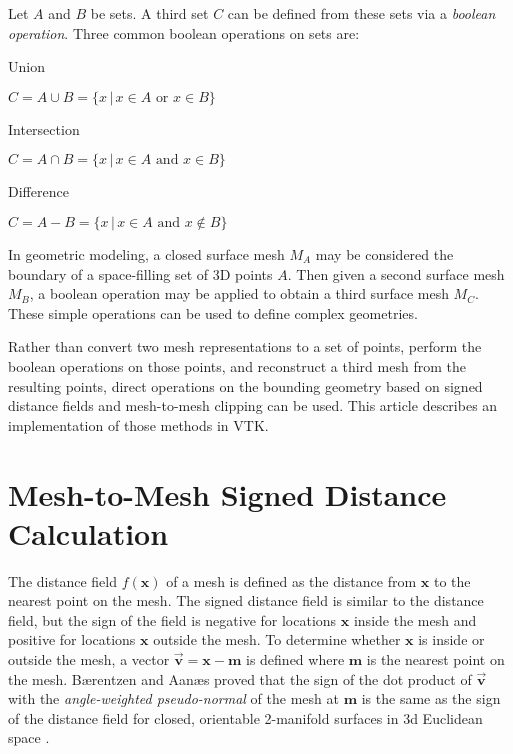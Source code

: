 \documentclass{InsightArticle}
\def\x{{\mathbf x}}
\def\m{{\mathbf m}}
\def\v{{\overrightarrow{\mathbf v}}}
\begin{document}
Let $A$ and $B$ be sets. A third set $C$ can be defined from these sets via a \emph{boolean operation}. Three common boolean operations on sets are:

\begin{description}

\item Union

 $C = A \cup B = \{ x \, | \, x \in A \text{ or } x \in B \}$

\item Intersection

$C = A \cap B = \{ x \, | \, x \in A \text{ and } x \in B \}$

\item Difference

$C = A - B = \{ x \, | \, x \in A \text{ and } x \notin B \}$

\end{description}

In geometric modeling, a closed surface mesh $M_A$ may be considered the boundary of a space-filling set of 3D points $A$. Then given a second surface mesh $M_B$, a boolean operation may be applied to obtain a third surface mesh $M_C$. These simple operations can be used to define complex geometries.

Rather than convert two mesh representations to a set of points, perform the boolean operations on those points, and reconstruct a third mesh from the resulting points, direct operations on the bounding geometry based on signed distance fields and mesh-to-mesh clipping can be used. This article describes an implementation of those methods in VTK.

\section{Mesh-to-Mesh Signed Distance Calculation}

The distance field $f(\x)$ of a mesh is defined as the distance from $\x$ to the nearest point on the mesh. The signed distance field is similar to the distance field, but the sign of the field is negative for locations $\x$ inside the mesh and positive for locations $\x$ outside the mesh. To determine whether $\x$ is inside or outside the mesh, a vector $\v = \x - \m$ is defined where $\m$ is the nearest point on the mesh. B\ae rentzen and Aan\ae s proved that the sign of the dot product of $\v$ with the \emph{angle-weighted pseudo-normal} of the mesh at $\m$ is the same as the sign of the distance field for closed, orientable 2-manifold surfaces in 3d Euclidean space \cite{Baerentzen2005}.  
\end{document}
